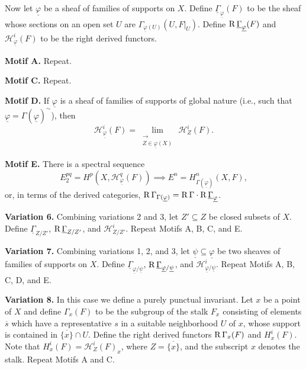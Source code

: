 Now let $\underline{\varphi}$ be a sheaf of families of supports on $X$. Define $\underline{\Gamma}_{\underline{\varphi}}(F)$ to be the sheaf whose sections on an open set $U$ are $\Gamma_{\underline{\varphi}(U)}(U,F|_U)$. Define $\operatorname{R}\underline{\Gamma}_{\underline{\varphi}}(F)$ and $\mathcal{H}^{i}_{\underline{\varphi}}(F)$ to be the right derived functors.

\medskip\noindent\textbf{Motif A.} Repeat.

\medskip\noindent\textbf{Motif C.} Repeat.

\medskip\noindent\textbf{Motif D.} If $\underline{\varphi}$ is a sheaf of families of supports of global nature (i.e., such that $\underline{\varphi}=\Gamma(\underline{\varphi})^{\sim}$), then
\[
\mathcal{H}_{\underline{\varphi}}^{i}(F)=\lim_{\substack{\longrightarrow \\ Z\in\underline{\varphi}(X)}}\,\mathcal{H}_{Z}^{i}(F).
\]

\medskip\noindent\textbf{Motif E.} There is a spectral sequence
\[
E_2^{pq}=H^p(X, \mathcal{H}_{\underline{\varphi}}^q(F))\implies E^n=H_{\Gamma(\underline{\varphi})}^n(X, F),
\]
or, in terms of the derived categories, $\operatorname{R}\Gamma_{\Gamma(\underline{\varphi})} = \operatorname{R}\Gamma\cdot \operatorname{R}\underline{\Gamma}_{\underline{\varphi}}$.

\medskip\noindent\textbf{Variation 6.}
Combining variations 2 and 3, let $Z'\subseteq Z$ be closed subsets of $X$. Define $\underline{\Gamma}_{Z/Z'}$, $\operatorname{R}\underline{\Gamma}_{Z/Z'}$, and $\mathcal{H}^i_{Z/Z'}$. Repeat Motifs A, B, C, and E.

\medskip\noindent\textbf{Variation 7.}
Combining variations 1, 2, and 3, let $\underline{\psi}\subseteq\underline{\varphi}$ be two sheaves of families of supports on $X$. Define $\underline{\Gamma}_{\underline{\varphi}/\underline{\psi}}$, $\operatorname{R}\underline{\Gamma}_{\underline{\varphi}/\underline{\psi}}$, and $\mathcal{H}_{\underline{\varphi}/\underline{\psi}}^{i}$. Repeat Motifs A, B, C, D, and E.

\medskip\noindent\textbf{Variation 8.}
In this case we define a purely punctual invariant. Let $x$ be a point of $X$ and define $\Gamma_x(F)$ to be the subgroup of the stalk $F_x$ consisting of elements $\overline{s}$ which have a representative $s$ in a suitable neighborhood $U$ of $x$, whose support is contained in $\overline{\{x\}}\cap U$. Define the right derived functors $\operatorname{R}\Gamma_x(F)$ and $H_x^{i}(F)$. Note that $H_x^{i}(F)=\mathcal{H}_Z^{i}(F)_x$, where $Z=\overline{\{x\}}$, and the subscript $x$ denotes the stalk. Repeat Motifs A and C.

